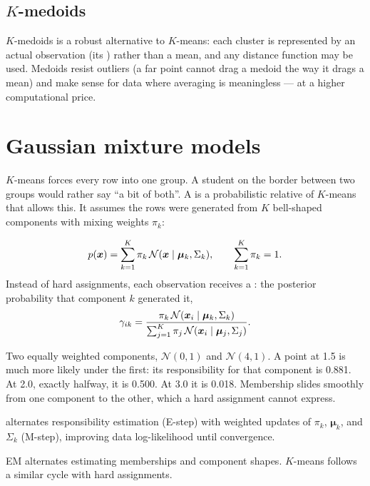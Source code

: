 \subsection{$K$-medoids}

$K$-medoids is a robust alternative to $K$-means: each cluster is represented by an actual observation (its ) rather than a mean, and any distance function may be used. Medoids resist outliers (a far point cannot drag a medoid the way it drags a mean) and make sense for data where averaging is meaningless --- at a higher computational price.

\section{Gaussian mixture models}

$K$-means forces every row into one group. A student on the border between two groups would rather say ``a bit of both''. A  is a probabilistic relative of $K$-means that allows this. It assumes the rows were generated from $K$ bell-shaped components with mixing weights $\pi_k$:

\[
  p(\bm{x})
  =\sum_{k=1}^{K}
  \pi_k\,
  \mathcal{N}(\bm{x}\mathrel{|}\bm{\mu}_k,\Sigma_k),
  \qquad
  \sum_{k=1}^{K}\pi_k=1 .
\]
Instead of hard assignments, each observation receives a : the posterior probability that component $k$ generated it,
\[
  \gamma_{ik}
  =\frac{\pi_k\,\mathcal{N}(\bm{x}_i\mathrel{|}\bm{\mu}_k,\Sigma_k)}
        {\sum_{j=1}^{K}\pi_j\,\mathcal{N}(\bm{x}_i\mathrel{|}\bm{\mu}_j,\Sigma_j)} .
\]

\begin{workedexample}
Two equally weighted components, $\mathcal{N}(0,1)$ and $\mathcal{N}(4,1)$. A point at 1.5 is much more likely under the first: its responsibility for that component is 0.881. At 2.0, exactly halfway, it is 0.500. At 3.0 it is 0.018. Membership slides smoothly from one component to the other, which a hard assignment cannot express.
\end{workedexample}

 alternates responsibility estimation (E-step) with weighted updates of $\pi_k$, $\bm\mu_k$, and $\Sigma_k$ (M-step), improving data log-likelihood until convergence.

\begin{intuition}
EM alternates estimating memberships and component shapes. $K$-means follows a similar cycle with hard assignments.
\end{intuition}

